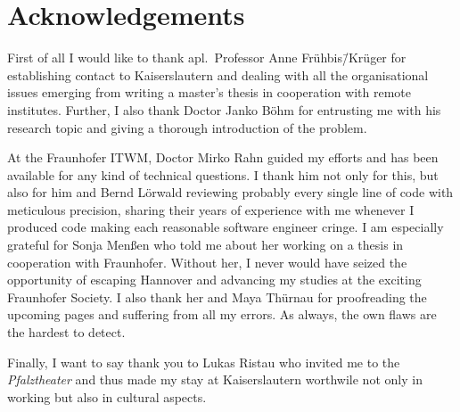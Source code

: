\chapter*{Acknowledgements}

First of all I would like to thank apl.~Professor Anne Frühbis\=/Krüger for establishing contact to Kaiserslautern and dealing with all the organisational issues emerging from writing a master's thesis in cooperation with remote institutes. Further, I also thank Doctor Janko Böhm for entrusting me with his research topic and giving a thorough introduction of the problem.

At the \acl{Fraunhofer ITWM}, Doctor Mirko Rahn guided my efforts and has been available for any kind of technical questions. I thank him not only for this, but also for him and Bernd Lörwald reviewing probably every single line of code with meticulous precision, sharing their years of experience with me whenever I produced code making each reasonable software engineer cringe. I am especially grateful for Sonja Menßen who told me about her working on a thesis in cooperation with Fraunhofer. Without her, I never would have seized the opportunity of escaping Hannover and advancing my studies at the exciting Fraunhofer Society. I also thank her and Maya Thürnau for proofreading the upcoming pages and suffering from all my errors. As always, the own flaws are the hardest to detect.

Finally, I want to say thank you to Lukas Ristau who invited me to the \emph{Pfalztheater} and thus made my stay at Kaiserslautern worthwile not only in working but also in cultural aspects.
